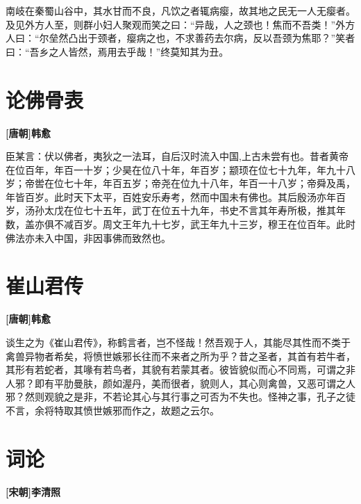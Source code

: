 \documentclass[UTF8,titlepage,oneside]{ctexbook}
\begin{document}
南岐在秦蜀山谷中，其水甘而不良，凡饮之者辄病瘿，故其地之民无一人无瘿者。及见外方人至，则群小妇人聚观而笑之曰：“异哉，人之颈也！焦而不吾类！”外方人曰：“尔垒然凸出于颈者，瘿病之也，不求善药去尔病，反以吾颈为焦耶？”笑者曰：“吾乡之人皆然，焉用去乎哉！”终莫知其为丑。


\chapter*{论佛骨表}
\begin{center}
	\textbf{[唐朝]韩愈}
\end{center}

臣某言：伏以佛者，夷狄之一法耳，自后汉时流入中国,上古未尝有也。昔者黄帝在位百年，年百一十岁；少昊在位八十年，年百岁；颛顼在位七十九年，年九十八岁；帝喾在位七十年，年百五岁；帝尧在位九十八年，年百一十八岁；帝舜及禹，年皆百岁。此时天下太平，百姓安乐寿考，然而中国未有佛也。其后殷汤亦年百岁，汤孙太戊在位七十五年，武丁在位五十九年，书史不言其年寿所极，推其年数，盖亦俱不减百岁。周文王年九十七岁，武王年九十三岁，穆王在位百年。此时佛法亦未入中国，非因事佛而致然也。



\chapter*{崔山君传}
\begin{center}
	\textbf{[唐朝]韩愈}
\end{center}

谈生之为《崔山君传》，称鹤言者，岂不怪哉！然吾观于人，其能尽其性而不类于禽兽异物者希矣，将愤世嫉邪长往而不来者之所为乎？昔之圣者，其首有若牛者，其形有若蛇者，其喙有若鸟者，其貌有若蒙其者。彼皆貌似而心不同焉，可谓之非人邪？即有平肋曼肤，颜如渥丹，美而很者，貌则人，其心则禽兽，又恶可谓之人邪？然则观貌之是非，不若论其心与其行事之可否为不失也。怪神之事，孔子之徒不言，余将特取其愤世嫉邪而作之，故题之云尔。



\chapter*{词论}
\begin{center}
	\textbf{[宋朝]李清照}
\end{center}
\end{document}
